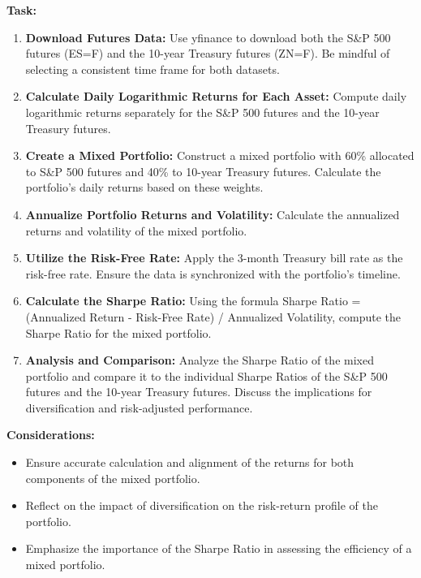 \documentclass{article}
\begin{document}
\textbf{Task:}
\begin{enumerate}
    \item \textbf{Download Futures Data:} Use yfinance to download both the S\&P 500 futures (ES=F) and the 10-year Treasury futures (ZN=F). Be mindful of selecting a consistent time frame for both datasets.
    
    \item \textbf{Calculate Daily Logarithmic Returns for Each Asset:} Compute daily logarithmic returns separately for the S\&P 500 futures and the 10-year Treasury futures.
    
    \item \textbf{Create a Mixed Portfolio:} Construct a mixed portfolio with 60\% allocated to S\&P 500 futures and 40\% to 10-year Treasury futures. Calculate the portfolio's daily returns based on these weights.
    
    \item \textbf{Annualize Portfolio Returns and Volatility:} Calculate the annualized returns and volatility of the mixed portfolio.
    
    \item \textbf{Utilize the Risk-Free Rate:} Apply the 3-month Treasury bill rate as the risk-free rate. Ensure the data is synchronized with the portfolio's timeline.
    
    \item \textbf{Calculate the Sharpe Ratio:} Using the formula Sharpe Ratio = (Annualized Return - Risk-Free Rate) / Annualized Volatility, compute the Sharpe Ratio for the mixed portfolio.
    
    \item \textbf{Analysis and Comparison:} Analyze the Sharpe Ratio of the mixed portfolio and compare it to the individual Sharpe Ratios of the S\&P 500 futures and the 10-year Treasury futures. Discuss the implications for diversification and risk-adjusted performance.
\end{enumerate}

\textbf{Considerations:}
\begin{itemize}
    \item Ensure accurate calculation and alignment of the returns for both components of the mixed portfolio.
    \item Reflect on the impact of diversification on the risk-return profile of the portfolio.
    \item Emphasize the importance of the Sharpe Ratio in assessing the efficiency of a mixed portfolio.
\end{itemize}
\end{document}
